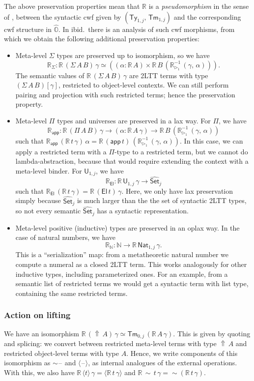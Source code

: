 \documentclass[acmsmall]{acmart}
\newcommand{\msf}[1]{\mathsf{#1}}
\newcommand{\mbb}[1]{\mathbb{#1}}
\newcommand{\wh}[1]{\widehat{#1}}
\newcommand{\ext}{\triangleright}
\newcommand{\El}{\msf{El}}
\newcommand{\app}{\msf{app}}
\newcommand{\Lift}{{\Uparrow}}
\newcommand{\spl}{{\sim}}
\newcommand{\qut}[1]{\langle #1\rangle}
\newcommand{\mbbo}{\mbb{O}}
\renewcommand{\U}{\msf{U}}
\newcommand{\Ty}{\msf{Ty}}
\newcommand{\Tm}{\msf{Tm}}
\newcommand{\Nat}{\msf{Nat}}
\newcommand{\Set}{\mathsf{Set}}
\newcommand{\blank}{{\mathord{\hspace{1pt}\text{--}\hspace{1pt}}}}
\newcommand{\hato}{\bm\hat{\mbbo}}
\newcommand{\re}{\mbb{R}}
\theoremstyle{remark}
\newcommand{\whset}{\wh{\Set}}
\newcommand{\rexti}{\re_{\ext_1}^{-1}}
\begin{document}
The above preservation properties mean that $\re$ is a \emph{pseudomorphism} in
the sense of \cite{gluing}, between the syntactic cwf given by
$(\Ty_{1,j},\,\Tm_{1,j})$ and the corresponding cwf structure in $\hato$. In
ibid.\ there is an analysis of such cwf morphisms, from which we obtain the
following additional preservation properties:
\begin{itemize}
\item Meta-level $\Sigma$ types are preserved up to isomorphism, so we have
  \[ \re_{\Sigma} : \re\,(\Sigma\,A\,B)\,\gamma
  \simeq ((\alpha : \re\,A) \times \re\,B\,(\rexti\,(\gamma,\,\alpha))). \]
  The semantic values of $\re\,(\Sigma\,A\,B)\,\gamma$
  are 2LTT terms with type $(\Sigma\,A\,B)[\gamma]$, restricted to object-level contexts.
  We can still perform pairing and projection with such restricted terms; hence
  the preservation property.
\item Meta-level $\Pi$ types and universes are preserved in a lax way. For $\Pi$, we have
  \[ \re_{\app} : \re\,(\Pi\,A\,B)\,\gamma \to (\alpha : \re\,A\,\gamma) \to \re\,B\,(\rexti\,(\gamma,\,\alpha))
  \]
  such that $\re_{\app}\,(\re\,t\,\gamma)\,\alpha =
  \re\,(\app\,t)\,(\rexti\,(\gamma,\,\alpha))$. In this case, we can apply a
  restricted term with a $\Pi$-type to a restricted term, but we cannot do
  lambda-abstraction, because that would require extending the context with a
  meta-level binder. For $\U_{1,j}$, we have
  \[
    \re_{\El} : \re\,\U_{1,j}\,\gamma \to \whset_j
  \]
  such that $\re_{\El}\,(\re\,t\,\gamma) = \re\,(\El\,t)\,\gamma$. Here, we only
  have lax preservation simply because $\whset_j$ is much larger than the the
  set of syntactic 2LTT types, so not every semantic $\whset_j$ has a syntactic
  representation.

\item Meta-level positive (inductive) types are preserved in an oplax way. In the case of
  natural numbers, we have
  \[ \re_{\mbb{N}} : \mbb{N} \to \re\,\Nat_{1,j}\,\gamma. \]
  This is a ``serialization'' map: from a metatheoretic natural number we
  compute a numeral as a closed 2LTT term. This works analogously for other
  inductive types, including parameterized ones. For an example, from a semantic
  list of restricted terms we would get a syntactic term with list type,
  containing the same restricted terms.
\end{itemize}
\subsubsection{Action on lifting} We have an isomorphism $\re\,(\Lift\,A)\,\gamma \simeq
\Tm_{0,j}\,(\re\,A\,\gamma)$. This is given by quoting and splicing: we convert
between restricted meta-level terms with type $\Lift\,A$ and restricted
object-level terms with type $A$. Hence, we write components of this isomorphism
as $\spl\blank$ and $\qut{\blank}$, as internal analogues of the external
operations. With this, we also have $\re\,\qut{t}\,\gamma =
\qut{\re\,t\,\gamma}$ and $\re\,\spl\,t\,\gamma = \spl(\re\,t\,\gamma)$.
\end{document}
